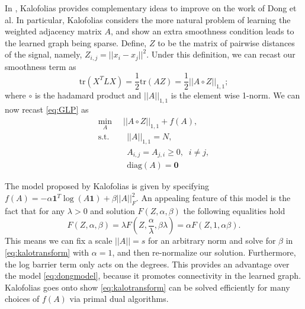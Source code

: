 \documentclass[journal]{IEEEtran}
\theoremstyle{definition}
\theoremstyle{remark}
\begin{document}
In \cite{kalofolias2016learn}, Kalofolias provides complementary ideas to improve on the work of Dong et al. In particular, Kalofolias considers the more natural problem of learning the weighted adjacency matrix $A$, and show an extra smoothness condition leads to the learned graph being sparse. Define, $Z$ to be the matrix of pairwise distances of the signal, namely, $Z_{i,j} = ||x_i - x_j||^2$. Under this definition, we can recast our smoothness term as 
\begin{equation}
	\label{eq:kalotransform}
	\text{tr}(X^TLX) = \frac{1}{2} \text{tr}(AZ) = \frac{1}{2}  ||A\circ Z||_{1,1};
\end{equation}
where $\circ$ is the hadamard product and $||A||_{1,1}$ is the element wise 1-norm. We can now recast \ref{eq:GLP} as 
\begin{equation}
	\label{eq:GLP}
	\begin{aligned}
		\min_A       & \phantom{..} ||A\circ Z||_{1,1} + f(A), \\
		\textrm{s.t.}& \quad ||A||_{1,1} = N,\\
		& \quad A_{i,j} = A_{j,i} \geq 0, \phantom{..} i \neq j, \\
		& \quad \text{diag}(A) = \textbf{0}
	\end{aligned}
\end{equation}

The model proposed by Kalofolias is given by specifying $f(A) = -\alpha \textbf{1}^T\log(A\textbf{1}) + \beta||A||_F^2$. An appealing feature of this model is the fact that for any $\lambda >0$ and solution $F(Z,\alpha, \beta)$ the following equalities hold
\begin{equation}
	\label{eq:KalofoliasEquality}
	F(Z, \alpha, \beta) = \lambda F(Z, \frac{\alpha}{\lambda}, \beta \lambda) = \alpha F(Z, 1, \alpha \beta).
\end{equation}
This means we can fix a scale $||A|| = s$ for an arbitrary norm and solve for $\beta$ in \ref{eq:kalotransform} with $\alpha = 1$, and then re-normalize our solution. Furthermore, the log barrier term only acts on the degrees. This provides an advantage over the model \ref{eq:dongmodel}, because it promotes connectivity in the learned graph. Kalofolias goes onto show \ref{eq:kalotransform} can be solved efficiently for many choices of $f(A)$ via primal dual algorithms. 
\end{document}
